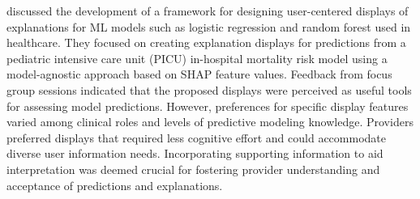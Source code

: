 \cite{barda2020qualitative} discussed the development of a framework for designing user-centered displays of explanations for ML models such as logistic regression and random forest used in healthcare. 
They focused on creating explanation displays for predictions from a pediatric intensive care unit (PICU) in-hospital mortality risk model using a model-agnostic approach based on SHAP feature values. 
Feedback from focus group sessions indicated that the proposed displays were perceived as useful tools for assessing model predictions. However, preferences for specific display features varied among clinical roles and levels of predictive modeling knowledge. 
Providers preferred displays that required less cognitive effort and could accommodate diverse user information needs. Incorporating supporting information to aid interpretation was deemed crucial for fostering provider understanding and acceptance of predictions and explanations. 


